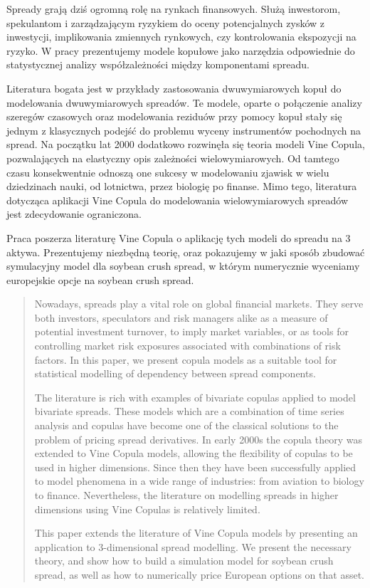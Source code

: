 \begin{streszczenie}
	Spready grają dziś ogromną rolę na rynkach finansowych. Służą inwestorom, spekulantom i zarządzającym ryzykiem do oceny potencjalnych zysków z inwestycji, implikowania zmiennych rynkowych, czy kontrolowania ekspozycji na ryzyko. W pracy prezentujemy modele kopułowe jako narzędzia odpowiednie do statystycznej analizy współzależności między komponentami spreadu. 
	
	Literatura bogata jest w przykłady zastosowania dwuwymiarowych kopuł do modelowania dwuwymiarowych spreadów. Te modele, oparte o połączenie analizy szeregów czasowych oraz modelowania reziduów przy pomocy kopuł stały się jednym z klasycznych podejść do problemu wyceny instrumentów pochodnych na spread. Na początku lat 2000 dodatkowo rozwinęła się teoria modeli Vine Copula, pozwalających na elastyczny opis zależności wielowymiarowych. Od tamtego czasu konsekwentnie odnoszą one sukcesy w modelowaniu zjawisk w wielu dziedzinach nauki, od lotnictwa, przez biologię po finanse. Mimo tego, literatura dotycząca aplikacji Vine Copula do modelowania wielowymiarowych spreadów jest zdecydowanie ograniczona. 
	
	Praca poszerza literaturę Vine Copula o aplikację tych modeli do spreadu na 3 aktywa. Prezentujemy niezbędną teorię, oraz pokazujemy w jaki sposób zbudować symulacyjny model dla soybean crush spread, w którym numerycznie wyceniamy europejskie opcje na soybean crush spread. 
\end{streszczenie}

\begin{abstract}
	Nowadays, spreads play a vital role on global financial markets. They serve both investors, speculators and risk managers alike as a measure of potential investment turnover, to imply market variables, or as tools for controlling market risk exposures associated with combinations of risk factors. In this paper, we present copula models as a suitable tool for statistical modelling of dependency between spread components.
	
	The literature is rich with examples of bivariate copulas applied to model bivariate spreads. These models which are a combination of time series analysis and copulas have become one of the classical solutions to the problem of pricing spread derivatives. In early 2000s the copula theory was extended to Vine Copula models, allowing the flexibility of copulas to be used in higher dimensions. Since then they have been successfully applied to model phenomena in a wide range of industries: from aviation to biology to finance. Nevertheless, the literature on modelling spreads in higher dimensions using Vine Copulas is relatively limited.
	
	This paper extends the literature of Vine Copula models by presenting an application to 3-dimensional spread modelling. We present the necessary theory, and show how to build a simulation model for soybean crush spread, as well as how to numerically price European options on that asset.
	
\end{abstract}
